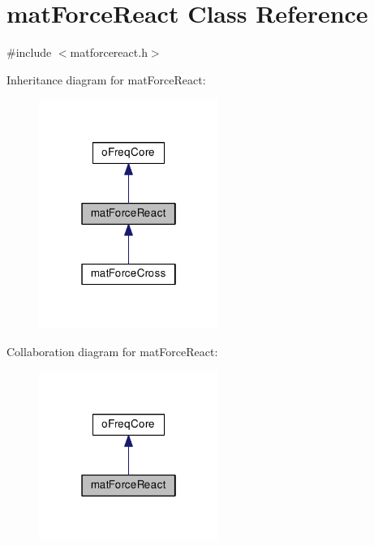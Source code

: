 \hypertarget{classmat_force_react}{\section{mat\-Force\-React Class Reference}
\label{classmat_force_react}
}


{\ttfamily \#include $<$matforcereact.\-h$>$}



Inheritance diagram for mat\-Force\-React\-:\nopagebreak
\begin{figure}[H]
\begin{center}
\leavevmode
\includegraphics[width=166pt]{classmat_force_react__inherit__graph}
\end{center}
\end{figure}


Collaboration diagram for mat\-Force\-React\-:\nopagebreak
\begin{figure}[H]
\begin{center}
\leavevmode
\includegraphics[width=166pt]{classmat_force_react__coll__graph}
\end{center}
\end{figure}
